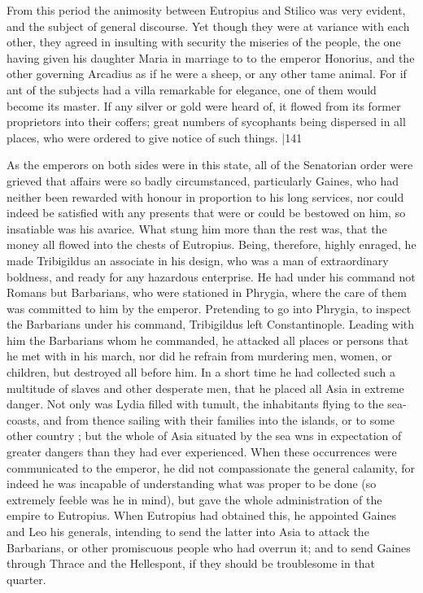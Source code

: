 From this period the animosity between Eutropius and Stilico was very evident, and the subject of general discourse. Yet though they were at variance with each other, they agreed in insulting with security the miseries of the people, the one having given his daughter Maria in marriage to to the emperor Honorius, and the other governing Arcadius as if he were a sheep, or any other tame animal. For if ant of the subjects had a villa remarkable for elegance, one of them would become its master. If any silver or gold were heard of, it flowed from its former proprietors into their coffers; great numbers of sycophants being dispersed in all places, who were ordered to give notice of such things.
|141

As the emperors on both sides were in this state, all of the Senatorian order were grieved that affairs were so badly circumstanced, particularly Gaines, who had neither been rewarded with honour in proportion to his long services, nor could indeed be satisfied with any presents that were or could be bestowed on him, so insatiable was his avarice. What stung him more than the rest was, that the money all flowed into the chests of Eutropius. Being, therefore, highly enraged, he made Tribigildus an associate in his design, who was a man of extraordinary boldness, and ready for any hazardous enterprise. He had under his command not Romans but Barbarians, who were stationed in Phrygia, where the care of them was committed to him by the emperor. Pretending to go into Phrygia, to inspect the Barbarians under his command, Tribigildus left Constantinople. Leading with him the Barbarians whom he commanded, he attacked all places or persons that he met with in his march, nor did he refrain from murdering men, women, or children, but destroyed all before him. In a short time he had collected such a multitude of slaves and other desperate men, that he placed all Asia in extreme danger. Not only was Lydia filled with tumult, the inhabitants flying to the sea-coasts, and from thence sailing with their families into the islands, or to some other country ; but the whole of Asia situated by the sea wns in expectation of greater dangers than they had ever experienced. When these occurrences were communicated to the emperor, he did not compassionate the general calamity, for indeed he was incapable of understanding what was proper to be done (so extremely feeble was he in mind), but gave the whole administration of the empire to Eutropius. When Eutropius had obtained this, he appointed Gaines and Leo his generals, intending to send the latter into Asia to attack the Barbarians, or other promiscuous people who had overrun it; and to send Gaines through Thrace and the Hellespont, if they should be troublesome in that quarter.

